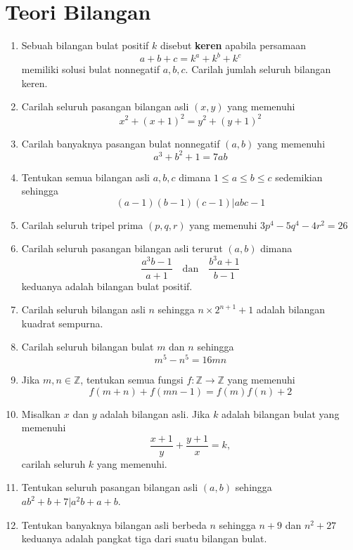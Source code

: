 \documentclass[12pt]{article}
\begin{document}
	\section{Teori Bilangan}
	\begin{enumerate}
		\item
		Sebuah bilangan bulat positif 
		$k$ disebut \textbf{keren} apabila persamaan 
		$$a+b+c=k^a+k^b+k^c$$
		memiliki solusi bulat nonnegatif $a,b,c$.
		Carilah jumlah seluruh bilangan keren.
		
		\item
		Carilah seluruh pasangan bilangan asli $(x,y)$ yang memenuhi \[ 
		x^2+(x+1)^2 = y^2+(y+1)^2
		\]
		
		\item
		Carilah banyaknya pasangan bulat nonnegatif $(a,b)$ yang memenuhi
		\[
		a^3+b^2+1=7ab
		\]
		
		\item
		Tentukan semua bilangan asli $a,b,c$ dimana  $ 1 \leq a \le b \le c$ sedemikian sehingga
		\[
		(a-1)(b-1)(c-1) | abc -1
		\]
		
		\item
		Carilah seluruh tripel prima $(p,q,r)$ yang memenuhi $3p^4-5q^4-4r^2=26$
		
		\item
		Carilah seluruh pasangan bilangan asli terurut $(a,b)$ dimana
		\[
		\dfrac{a^3b-1}{a+1} \quad \textrm{dan} \quad \dfrac{b^3a+1}{b-1}
		\]
		keduanya adalah bilangan bulat positif.
		
		\item
		Carilah seluruh bilangan asli $n$ sehingga $n \times 2^{n+1}+1$ adalah bilangan kuadrat sempurna.
		
		\item
		Carilah seluruh bilangan bulat $m$ dan $n$ sehingga 
		\[
		m^5-n^5=16mn
		\]
		
		\item
		Jika $m,n \in \mathbb{Z}$, tentukan semua fungsi $f:\mathbb{Z} \rightarrow \mathbb{Z}$ yang memenuhi 
		\[
		f(m+n)+f(mn-1)=f(m)f(n)+2
		\]
		
		\item
		Misalkan $x$ dan $y$ adalah bilangan asli. Jika $k$ adalah bilangan bulat yang memenuhi
		\[
		\dfrac{x+1}{y}+\dfrac{y+1}{x}=k,
		\]
		carilah seluruh $k$ yang memenuhi.
		
		\item
		Tentukan seluruh pasangan bilangan asli $(a,b)$ sehingga $ab^2+b+7|a^2b+a+b$.
		
		\item
		Tentukan banyaknya bilangan asli berbeda $n$ sehingga $n+9$ dan $n^2+27$ keduanya adalah pangkat tiga dari suatu bilangan bulat.
	\end{enumerate}
	
	
\end{document}
